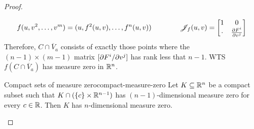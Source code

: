 \begin{proofbox}
\begin{proof}
\begin{enumerate}
        \begin{equation*}
          f(u , v^2 , \dots , v^m) = (u , f^2(u,v) , \dots , f^n(u,v))
          \qquad \qquad
          \mathscr{J}_{f}(u,v) =
          \begin{bmatrix}
            1 & 0 \\
            \cdot & \frac{\partial F^i}{\partial v^j}
          \end{bmatrix}
        \end{equation*}
        Therefore, $ C \cap \overline{V}_a $ consists of exactly those points where the $ (n-1) \times (m-1) $ matrix $ [\partial F^i / \partial v^j] $ has rank less that $ n - 1 $.
        WTS $ f(C \cap \overline{V}_a) $ has measure zero in $ \mathbb{R}^n $.

        \begin{lemma}{Compact sets of measure zero}{compact-measure-zero}
          Let $ K \subseteq \mathbb{R}^n $ be a compact subset such that $ K \cap (\{c\} \times \mathbb{R}^{n-1}) $ has $ (n-1) $-dimensional measure zero for every $ c \in \mathbb{R} $. Then $ K $ has $ n $-dimensional measure zero.
        \end{lemma}


\end{enumerate}
\end{proof}
\end{proofbox}
